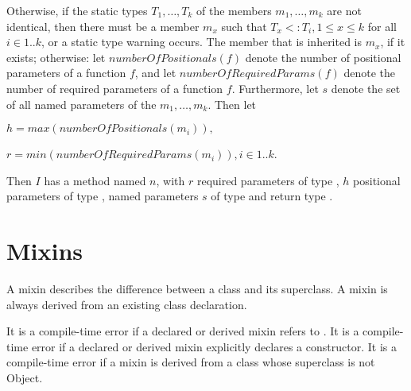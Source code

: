 \documentclass{article}
\newcommand{\code}[1]{{\sf #1}}
\begin{document}
\LMHash{}
Otherwise, if the static types $T_1, \ldots,  T_k$ of the members $m_1, \ldots,  m_k$  are not identical, then there must be a member $m_x$ such that $T_x <: T_i, 1 \le x \le k$ for all  $i  \in 1..k$, or a static type warning occurs. The member that is inherited  is $m_x$, if it exists; otherwise:
 let $numberOfPositionals(f)$ denote the number of positional parameters of a function $f$, and let $numberOfRequiredParams(f)$ denote the number of required parameters of a function $f$. Furthermore, let $s$ denote the set of all named parameters of the $m_1, \ldots,  m_k$.  Then let 

$h = max(numberOfPositionals(m_i)), $

$r = min(numberOfRequiredParams(m_i)), i \in 1..k$. 

\LMHash{}
Then $I$ has a method named $n$, with $r$ required parameters of type \DYNAMIC{}, $h$  positional parameters of type \DYNAMIC{}, named parameters $s$ of type  \DYNAMIC{} and  return type  \DYNAMIC{}.  






\section{Mixins}


\LMHash{}
A mixin describes the difference between a class and its superclass. A mixin is always derived from an existing class declaration. 

\LMHash{}
It is a compile-time error if a declared or derived mixin refers to \SUPER{}. It is a compile-time error if a declared or derived mixin explicitly declares a constructor. It is a compile-time error if a mixin is derived from a class whose superclass is not \code{Object}.
\end{document}
